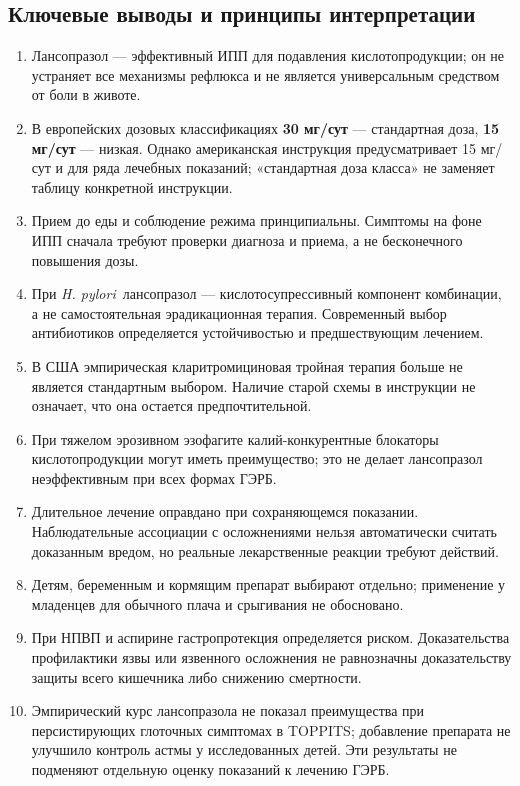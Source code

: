 \documentclass[11pt,a4paper,notitlepage]{report}
\newcommand{\Hp}{\textit{H. pylori}}
\newcommand{\src}[1]{\unskip\space\cite{#1}}
\begin{document}
\subsection{Ключевые выводы и принципы интерпретации}
\begin{enumerate}
\item Лансопразол --- эффективный ИПП для подавления кислотопродукции; он не устраняет все механизмы рефлюкса и не является универсальным средством от боли в животе.\src{uslabel,acggerd}
\item В европейских дозовых классификациях \textbf{30 мг/сут} --- стандартная доза, \textbf{15 мг/сут} --- низкая. Однако американская инструкция предусматривает 15 мг/сут и для ряда лечебных показаний; «стандартная доза класса» не заменяет таблицу конкретной инструкции.\src{nice,uslabel}
\item Прием до еды и соблюдение режима принципиальны. Симптомы на фоне ИПП сначала требуют проверки диагноза и приема, а не бесконечного повышения дозы.\src{acggerd,agagerd}
\item При \Hp\ лансопразол --- кислотосупрессивный компонент комбинации, а не самостоятельная эрадикационная терапия. Современный выбор антибиотиков определяется устойчивостью и предшествующим лечением.\src{acghp,maastricht}
\item В США эмпирическая кларитромициновая тройная терапия больше не является стандартным выбором. Наличие старой схемы в инструкции не означает, что она остается предпочтительной.\src{acghp}
\item При тяжелом эрозивном эзофагите калий-конкурентные блокаторы кислотопродукции могут иметь преимущество; это не делает лансопразол неэффективным при всех формах ГЭРБ.\src{vontrial,seoul}
\item Длительное лечение оправдано при сохраняющемся показании. Наблюдательные ассоциации с осложнениями нельзя автоматически считать доказанным вредом, но реальные лекарственные реакции требуют действий.\src{agadepres,uslabel,kidney}
\item Детям, беременным и кормящим препарат выбирают отдельно; применение у младенцев для обычного плача и срыгивания не обосновано.\src{infant,uktis,lactmed}
\item При НПВП и аспирине гастропротекция определяется риском. Доказательства профилактики язвы или язвенного осложнения не равнозначны доказательству защиты всего кишечника либо снижению смертности.\src{nice,aspirintrial,aspirin15,nsaid15}
\item Эмпирический курс лансопразола не показал преимущества при персистирующих глоточных симптомах в TOPPITS; добавление препарата не улучшило контроль астмы у исследованных детей. Эти результаты не подменяют отдельную оценку показаний к лечению ГЭРБ.\src{toppits,asthma}

\end{enumerate}
\end{document}
